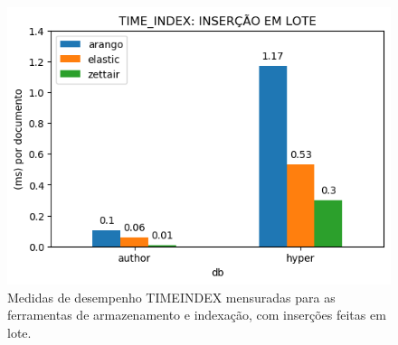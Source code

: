 \begin{figure}[ht]
    \centering
    \caption{Medidas de desempenho TIME\underscore{}INDEX mensuradas para as ferramentas de armazenamento e indexação, com inserções feitas em lote.}
    \vspace{-0.5cm}
    \begin{center}
        \includegraphics[scale=0.75]{img/time-index-bulk.png}
    \end{center}
    \vspace{-0.5cm}
    \label{fig:time-index-bulk}
\end{figure}